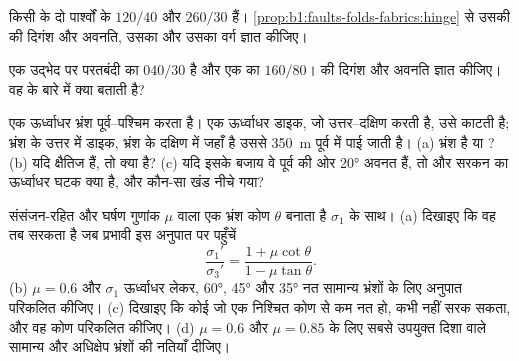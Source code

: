 \begin{exercise}[$\star\star$]
\label{exo:b1:faults-folds-fabrics:7}
किसी  के दो पार्श्वों के  $120/40$ और $260/30$ हैं। \cref{prop:b1:faults-folds-fabrics:hinge} से उसकी  की दिगंश और अवनति, उसका  और उसका वर्ग ज्ञात कीजिए।
\end{exercise}

\begin{exercise}[$\star\star$]
\label{exo:b1:faults-folds-fabrics:8}
एक उद्भेद पर परतबंदी का  $040/30$ है और एक  का  $160/80$।  की दिगंश और अवनति ज्ञात कीजिए। वह  के बारे में क्या बताती है?
\end{exercise}

\begin{exercise}[$\star\star$]
\label{exo:b1:faults-folds-fabrics:9}
एक ऊर्ध्वाधर भ्रंश पूर्व–पश्चिम  करता है। एक ऊर्ध्वाधर डाइक, जो उत्तर–दक्षिण  करती है, उसे काटती है; भ्रंश के उत्तर में डाइक, भ्रंश के दक्षिण में जहाँ है उससे \qty{350}{m} पूर्व में पाई जाती है। (a) भ्रंश  है या ? (b) यदि  क्षैतिज हैं, तो  क्या है? (c) यदि इसके बजाय वे पूर्व की ओर \ang{20} अवनत हैं, तो  और सरकन का ऊर्ध्वाधर घटक क्या है, और कौन-सा खंड नीचे गया?
\end{exercise}

\begin{exercise}[$\star\star\star$]
\label{exo:b1:faults-folds-fabrics:10}
संसंजन-रहित और घर्षण गुणांक $\mu$ वाला एक भ्रंश कोण $\theta$ बनाता है $\sigma_1$ के साथ। (a) दिखाइए कि वह तब सरकता है जब प्रभावी  इस अनुपात पर पहुँचें
\[
  \frac{\sigma_1'}{\sigma_3'} = \frac{1 + \mu\cot\theta}{1 - \mu\tan\theta} .
\]
(b) $\mu = 0.6$ और $\sigma_1$ ऊर्ध्वाधर लेकर, \ang{60}, \ang{45} और \ang{35} नत सामान्य भ्रंशों के लिए अनुपात परिकलित कीजिए। (c) दिखाइए कि कोई  जो एक निश्चित कोण से कम नत हो, कभी नहीं सरक सकता, और वह कोण परिकलित कीजिए। (d) $\mu = 0.6$ और $\mu = 0.85$ के लिए सबसे उपयुक्त दिशा वाले सामान्य और अधिक्षेप भ्रंशों की नतियाँ दीजिए।
\end{exercise}

